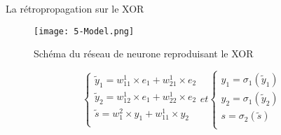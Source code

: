 \begin{frame}{La rétropropagation sur le XOR}
    \begin{figure}
        \centering
        \texttt{[image: 5-Model.png]}
        \caption{Schéma du réseau de neurone reproduisant le XOR}
    \end{figure}
    \begin{equation}
        \begin{cases}
            \tilde{y}_1 = w^1_{11}\times e_1 +  w^1_{21}\times e_2 \\
            \tilde{y}_2 = w^1_{12}\times e_1 +  w^1_{22}\times e_2 \\
            \tilde{s}   = w^2_{1}\times y_1 +  w^1_{11}\times y_2  \\
        \end{cases}
        et
        \begin{cases}
            y_1 = \sigma_1(\tilde{y}_1) \\
            y_2 = \sigma_1(\tilde{y}_2) \\
            s = \sigma_2(\tilde{s})     \\
        \end{cases}
    \end{equation}
\end{frame}

